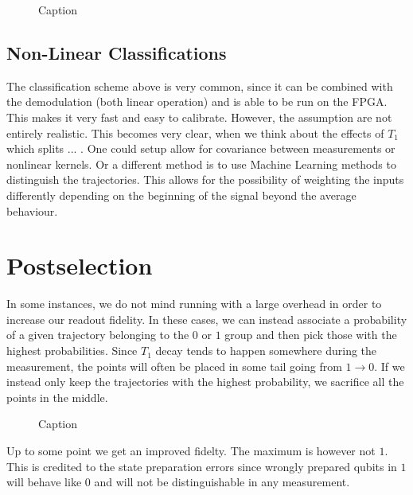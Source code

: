 \begin{figure}
    \centering
    \caption{Caption}
    \label{fig:matched_weights_fidelty}
\end{figure}


\subsection{Non-Linear Classifications}
The classification scheme above is very common, since it can be combined with the demodulation (both linear operation) and is able to be run on the FPGA. This makes it very fast and easy to calibrate. However, the assumption are not entirely realistic. This becomes very clear, when we think about the effects of $T_1$ which splits ... . One could setup allow for covariance between measurements or nonlinear kernels. Or a different method is to use Machine Learning methods to distinguish the trajectories. This allows for the possibility of weighting the inputs differently depending on the beginning of the signal beyond the average behaviour.



\section{Postselection}
In some instances, we do not mind running with a large overhead in order to increase our readout fidelity. In these cases, we can instead associate a probability of a given trajectory belonging to the $0$ or $1$ group and then pick those with the highest probabilities. Since $T_1$ decay tends to happen somewhere during the measurement, the points will often be placed in some tail going from $1 \to 0$. If we instead only keep the trajectories with the highest probability, we sacrifice all the points in the middle.

\begin{figure}
    \centering
    \caption{Caption}
    \label{fig:enter-label}
\end{figure}

Up to some point we get an improved fidelty. The maximum is however not $1$. This is credited to the state preparation errors since wrongly prepared qubits in $1$ will behave like $0$ and will not be distinguishable in any measurement. 


